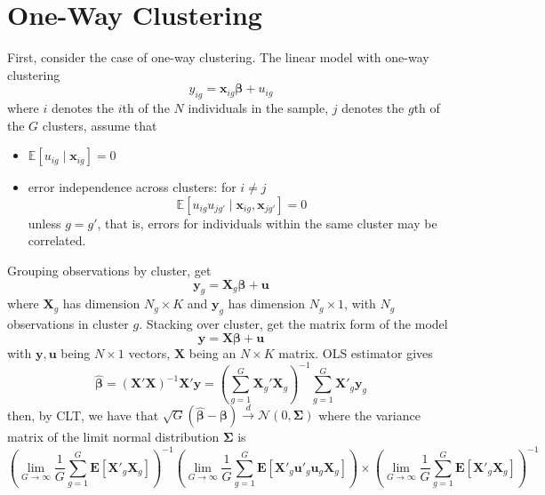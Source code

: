 \documentclass[twoside]{article}
\begin{document}

\section{One-Way Clustering}
First, consider the case of one-way clustering. The linear model with one-way clustering $$ y_{ig} = \mathbf{x}_{ig}\boldsymbol{\beta} + u_{ig} $$
where $i$ denotes the $i$th of the $N$ individuals in the sample, $j$ denotes the $g$th of the $G$ clusters, assume that
\begin{itemize}
    \item $\mathbb{E}\left[u_{ig}\mid \mathbf{x}_{ig}\right] =0$
    \item error independence across clusters: for $i\neq j$
    \begin{equation}\label{eq:error_independence}
        \mathbb{E}\left[ u_{ig} u_{jg'}\mid \mathbf{x}_{ig},\mathbf{x}_{jg'} \right] = 0
    \end{equation}
    unless $g=g'$, that is, errors for individuals within the same cluster may be correlated.
\end{itemize}
Grouping observations by cluster, get
$$
\mathbf{y}_g = \mathbf{X}_g \boldsymbol{\beta} + \mathbf{u}
$$
where $\mathbf{X}_g$ has dimension $N_g\times K$ and $\mathbf{y}_g$ has dimension $N_g \times 1$, with $N_g$ observations in cluster $g$. 
Stacking over cluster, get the matrix form of the model
$$
\mathbf{y=X}\boldsymbol{\beta}+\mathbf{u}
$$
with $\mathbf{y,u}$ being $N\times 1$ vectors, $\mathbf{X}$ being an $N\times K$ matrix. OLS estimator gives 
\begin{equation}\label{eq:OLSest}
    \hat{\boldsymbol{\beta}} = \left(\mathbf{X'X}\right)^{-1}\mathbf{X'y}=\left( \sum^G_{g=1}\mathbf{X}_g'\mathbf{X}_g \right)^{-1} \sum^G_{g=1}\mathbf{X}'_g\mathbf{y}_g
\end{equation}
then, by CLT, we have that $\sqrt{G} \left(\hat{\boldsymbol{\beta}}-\boldsymbol{\beta}\right) \xrightarrow{d} \mathcal{N}(0,\boldsymbol{\Sigma})$ where the variance matrix of the limit normal distribution $\boldsymbol{\Sigma}$ is 
\begin{equation}\label{eq:limit_varcovmat}
    \left( \lim_{G\rightarrow\infty}\frac{1}{G}\sum^G_{g=1} \mathbf{E}\left[\mathbf{X}'_g\mathbf{X}_g\right] \right)^{-1} \left(\lim_{G\rightarrow\infty}\frac{1}{G}\sum^G_{g=1} \mathbf{E}\left[\mathbf{X}'_g\mathbf{u}'_g\mathbf{u}_g\mathbf{X}_g\right] \right) \times \left( \lim_{G\rightarrow\infty}\frac{1}{G}\sum^G_{g=1} \mathbf{E}\left[\mathbf{X}'_g\mathbf{X}_g\right]  \right)^{-1}
\end{equation}
\end{document}
